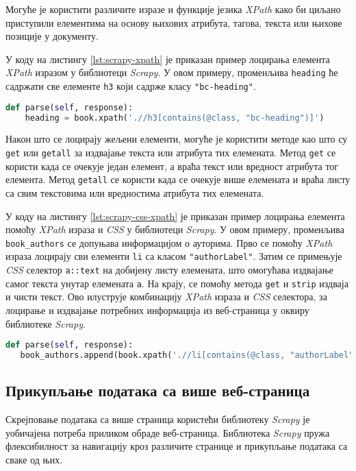 \documentclass[12pt,oneside]{memoir}
\begin{document}
Могуће је користити различите изразе и функције језика \textit{XPath} како би циљано приступили елементима на основу њихових атрибута, тагова, текста или њихове позиције у документу.

У коду на листингу \ref{lst:scrapy-xpath} је приказан пример лоцирања елемента \textit{XPath} изразом у библиотеци \textit{Scrapy}. У овом примеру, променљива \texttt{heading} ће садржати све елементе \texttt{h3} који садрже класу \texttt{"bc-heading"}. 
\begin{lstlisting}[language=Python, caption={Лоцирање елемента \textit{XPath} изразом}, label={lst:scrapy-xpath}]
def parse(self, response):
    heading = book.xpath('.//h3[contains(@class, "bc-heading")]')
\end{lstlisting}

Након што се лоцирају жељени елементи, могуће је користити методе као што су \texttt{get} или \texttt{getall} за издвајање текста или атрибута тих елемената. Метод \texttt{get} се користи када се очекује један елемент, а враћа текст или вредност атрибута тог елемента. Метод \texttt{getall} се користи када се очекује више елемената и враћа листу са свим текстовима или вредностима атрибута тих елемената. 

У коду на листингу \ref{lst:scrapy-css-xpath} је приказан пример лоцирања елемента помоћу \textit{XPath} израза и \textit{CSS} у библиотеци \textit{Scrapy}. У овом примеру, променљива \texttt{book\_authors} се допуњава информацијом о ауторима. Прво се помоћу \textit{XPath} израза лоцирају сви елементи \texttt{li} са класом \texttt{"authorLabel"}. Затим се примењује \textit{CSS} селектор \texttt{a::text} на добијену листу елемената, што омогућава издвајање самог текста унутар елемената \texttt{a}. На крају, се помоћу метода \texttt{get} и \texttt{strip} издваја и чисти текст. Ово илуструје комбинацију \textit{XPath} израза и \textit{CSS} селектора, за лоцирање и издвајање потребних информација из веб-страница у оквиру библиотеке \textit{Scrapy}.

\begin{lstlisting}[language=Python, caption={Лоцирање елемента \textit{XPath} изразом и \textit{CSS} селектором}, label={lst:scrapy-css-xpath}]
def parse(self, response):
   book_authors.append(book.xpath('.//li[contains(@class, "authorLabel")]').css('a::text').get().strip())
\end{lstlisting}

\subsection{Прикупљање података са више веб-страница}
Скрејповање података са више страница користећи библиотеку \textit{Scrapy} је уобичајена потреба приликом обраде веб-страница. Библиотека \textit{Scrapy} пружа флексибилност за навигацију кроз различите странице и прикупљање података са сваке од њих. 
\end{document}
